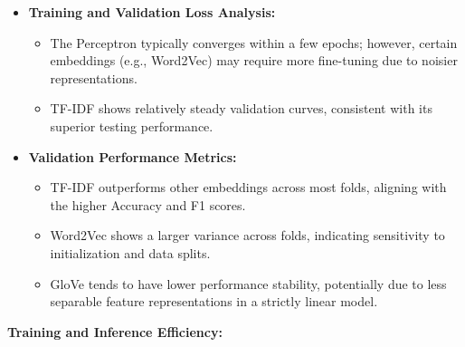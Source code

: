 \begin{itemize}
    \item \textbf{Training and Validation Loss Analysis:}
    \begin{itemize}
        \item The Perceptron typically converges within a few epochs; however, certain embeddings (e.g., Word2Vec) may require more fine-tuning due to noisier representations.
        \item TF-IDF shows relatively steady validation curves, consistent with its superior testing performance.
    \end{itemize}
    
    \item \textbf{Validation Performance Metrics:}
    \begin{itemize}
        \item TF-IDF outperforms other embeddings across most folds, aligning with the higher Accuracy and F1 scores.
        \item Word2Vec shows a larger variance across folds, indicating sensitivity to initialization and data splits.
        \item GloVe tends to have lower performance stability, potentially due to less separable feature representations in a strictly linear model.
    \end{itemize}
\end{itemize}

\textbf{Training and Inference Efficiency:}

